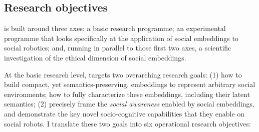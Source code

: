 \subsection{Research objectives}

\project is built around three axes: a basic research programme; an experimental
programme that looks specifically at the application of social embeddings to
social robotics; and, running in parallel to those first two axes, a scientific
investigation of the ethical dimension of social embeddings.

At the basic research level, \project targets two overarching research goals:
(1) how to build compact, yet semantics-preserving, embeddings to represent
arbitrary social environments; how to fully characterize these embeddings,
including their latent semantics; (2) precisely frame the \emph{social
awareness} enabled by social embeddings, and demonstrate the key novel
socio-cognitive capabilities that they enable on social robots.
I translate these two goals into six operational research objectives:


